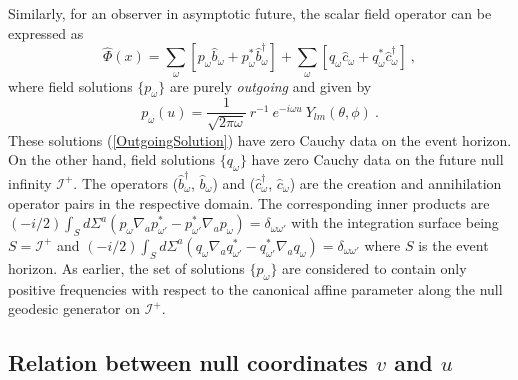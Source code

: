 \documentclass[aps,12pt,showpacs]{revtex4-2}
\def\scriplus{\mathscr{I}^{+}}
\begin{document}
Similarly, for an observer in asymptotic future, the scalar field operator 
can be expressed as 
%
\begin{equation}\label{ScalarFieldFutureOperator}
\hat{\Phi}(x) = 
\sum_{\omega} \left[ {p}_{\omega} \hat{b}_{\omega} + {p}^{*}_{\omega} 
\hat{b}^{\dagger}_{\omega} \right]
+
\sum_{\omega} \left[ {q}_{\omega} \hat{c}_{\omega} + {q}^{*}_{\omega} 
\hat{c}^{\dagger}_{\omega} \right]
~,
\end{equation}
%
where field solutions $\{{p}_{\omega}\}$ are purely \emph{outgoing} and 
given by
%
\begin{equation}\label{OutgoingSolution}
{p}_{\omega}(u) = \frac{1}{\sqrt{2\pi\omega}} ~ r^{-1}~ 
e^{-i\omega u} ~Y_{lm}(\theta,\phi) ~.
\end{equation}
%
These solutions (\ref{OutgoingSolution}) have zero Cauchy data on the event 
horizon. On the other hand, field solutions $\{{q}_{\omega}\}$ have zero Cauchy 
data on the future null infinity $\scriplus$. The operators 
($\hat{b}^{\dagger}_{\omega}$, $\hat{b}_{\omega}$) and 
($\hat{c}^{\dagger}_{\omega}$, $\hat{c}_{\omega}$) are the creation and 
annihilation operator pairs in the respective domain. The corresponding inner 
products are 
%
$(-i/2)\int_{S}d\Sigma^{a} \left({p}_{\omega} \nabla_a {p}^{*}_{\omega'} 
-{p}^{*}_{\omega'} \nabla_a {p}_{\omega} \right) = \delta_{\omega\omega'}$ 
%
with the integration surface being $S = \scriplus$ and 
%
$(-i/2)\int_{S}d\Sigma^{a} 
\left({q}_{\omega} \nabla_a {q}^{*}_{\omega'} -{q}^{*}_{\omega'} \nabla_a 
{q}_{\omega} \right) = \delta_{\omega\omega'}$ 
%
where $S$ is the event horizon. As earlier, the set of solutions 
$\{{p}_{\omega}\}$ are considered to contain only positive frequencies
with respect to the canonical affine parameter along the null geodesic 
generator on $\scriplus$.

%


\subsection{Relation between null coordinates $v$ and $u$}
\end{document}
